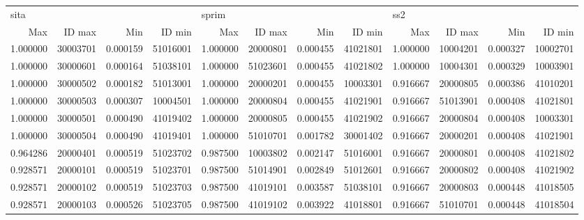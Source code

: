 \documentclass[11pt, titlepage]{article}
\begin{document}
\begin{landscape}
\begin{table}
\begin{tabular}{rrrrrrrrrrrr}
		\end{tabular}

		\begin{tabular}{rrrrrrrrrrrr}
			\toprule
			\multicolumn{4}{l}{sita} & \multicolumn{4}{l}{sprim} & \multicolumn{4}{l}{ss2} \\
				 Max &   ID max &      Min &   ID min &    Max &   ID max &      Min &   ID min &      Max &   ID max &      Min &   ID min \\
			\midrule
			1.000000 & 30003701 & 0.000159 & 51016001 & 1.000000 & 20000801 & 0.000455 & 41021801 & 1.000000 & 10004201 & 0.000327 & 10002701 \\
			1.000000 & 30000601 & 0.000164 & 51038101 & 1.000000 & 51023601 & 0.000455 & 41021802 & 1.000000 & 10004301 & 0.000329 & 10003901 \\
			1.000000 & 30000502 & 0.000182 & 51013001 & 1.000000 & 20000201 & 0.000455 & 10003301 & 0.916667 & 20000805 & 0.000386 & 41010201 \\
			1.000000 & 30000503 & 0.000307 & 10004501 & 1.000000 & 20000804 & 0.000455 & 41021901 & 0.916667 & 51013901 & 0.000408 & 41021801 \\
			1.000000 & 30000501 & 0.000490 & 41019402 & 1.000000 & 20000805 & 0.000455 & 41021902 & 0.916667 & 20000804 & 0.000408 & 10003301 \\
			1.000000 & 30000504 & 0.000490 & 41019401 & 1.000000 & 51010701 & 0.001782 & 30001402 & 0.916667 & 20000201 & 0.000408 & 41021901 \\
			0.964286 & 20000401 & 0.000519 & 51023702 & 0.987500 & 10003802 & 0.002147 & 51016001 & 0.916667 & 20000801 & 0.000408 & 41021802 \\
			0.928571 & 20000101 & 0.000519 & 51023701 & 0.987500 & 51014901 & 0.002849 & 51012601 & 0.916667 & 20000802 & 0.000408 & 41021902 \\
			0.928571 & 20000102 & 0.000519 & 51023703 & 0.987500 & 41019101 & 0.003587 & 51038101 & 0.916667 & 20000803 & 0.000448 & 41018505 \\
			0.928571 & 20000103 & 0.000526 & 51023705 & 0.987500 & 41019102 & 0.003922 & 41018801 & 0.916667 & 51010701 & 0.000448 & 41018504 \\
			
			\end{tabular}


\end{table}
\end{landscape}
\end{document}
